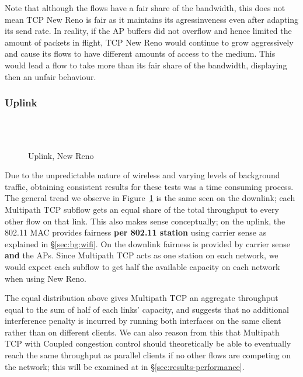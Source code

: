 Note that although the flows have a fair share of the bandwidth, this does not 
mean TCP New Reno is fair as it maintains its agressinveness even after adapting 
its send rate. In reality, if the AP buffers did not overflow and hence limited 
the amount of packets in flight, TCP New Reno would continue to grow 
aggressively and cause its flows to have different amounts of access to the 
medium. This would lead a flow to take more than its fair share of the 
bandwidth, displaying then an unfair behaviour.  

\subsubsection{Uplink}
\label{sec:results-mptcp-up}

\begin{figure}[h]
  \centering
  \\
  \subfloat[][2.4 GHz, non-overlapping channels] {\
    \scalebox{0.70}{}\label{graph:cc-reno-up}
  }
  \\
  \subfloat[][5 and 2.4 GHz] {\
    \scalebox{0.70}{}\label{graph:cb-reno-up}
  }
  \caption{Uplink, New Reno}\label{graph:reno-up}
\end{figure}

Due to the unpredictable nature of wireless and varying levels of background
traffic, obtaining consistent results for these tests was a time consuming
process. The general trend we observe in Figure~\ref{graph:reno-up} is the
same seen on the downlink; each Multipath TCP subflow gets an equal
share of the total throughput to every other flow on that link. This also makes
sense conceptually; on the uplink, the 802.11 MAC provides fairness
\textbf{per 802.11 station} using carrier sense as explained in
\S\ref{sec:bg:wifi}. On the downlink fairness is provided by carrier sense
\textbf{and} the APs. Since Multipath TCP acts as one station on each network,
we would expect each subflow to get half the available capacity on each network
when using New Reno.

The equal distribution above gives Multipath TCP an aggregate throughput equal
to the sum of half of each links' capacity, and suggests that no additional interference
penalty is incurred by running both interfaces on the same client rather than on
different clients. We can also reason from this that Multipath TCP with Coupled
congestion control should theoretically be able to eventually reach the same
throughput as parallel clients if no other flows are competing on the network; 
this will be examined at in \S\ref{sec:results-performance}.

